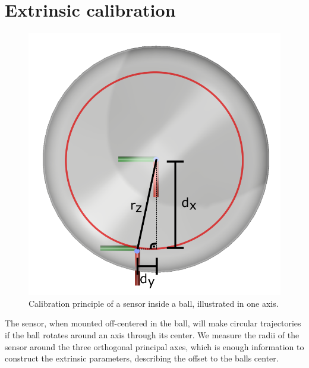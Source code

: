 \section{Extrinsic calibration}

\begin{figure}[h]
  \centering
  \includegraphics[width=.5\linewidth]{img/calibsphere}
  \caption{Calibration principle of a sensor inside a ball, illustrated in one axis.}
  \label{fig:calibsphere}
\end{figure}

The sensor, when mounted off-centered in the ball, will make circular trajectories if the ball rotates around an axis through its center.
We measure the radii of the sensor around the three orthogonal principal axes, which is enough information to construct the extrinsic parameters, describing the offset to the balls center.